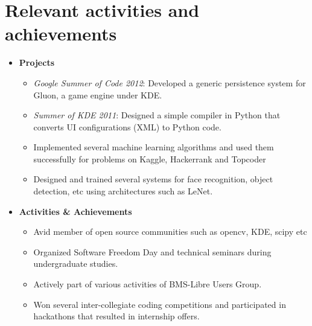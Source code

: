 \documentclass[10pt,letterpaper,sans]{moderncv}        %
\begin{document}
\section{Relevant activities and achievements}
\begin{itemize}
\item \textbf{Projects}
\begin{small}
\begin{itemize}
\item \textit{Google Summer of Code 2012}: Developed a generic persistence system for Gluon, a game engine under KDE.
\item \textit{Summer of KDE 2011}: Designed a simple compiler in Python that converts UI configurations (XML) to Python code.
\item Implemented several machine learning algorithms and used them successfully for problems on Kaggle, Hackerrank and Topcoder
\item Designed and trained several systems for face recognition, object detection, etc using architectures such as LeNet.
\end{itemize}
\end{small}
\item \textbf{Activities \& Achievements}
\begin{small}
\begin{itemize}
\item Avid member of open source communities such as opencv, KDE, scipy etc
\item Organized Software Freedom Day and technical seminars during undergraduate studies.
\item Actively part of various activities of BMS-Libre Users Group.
\item Won several inter-collegiate coding competitions and participated in hackathons that resulted in internship offers.
\end{itemize}
\end{small}
\end{itemize}
\end{document}
